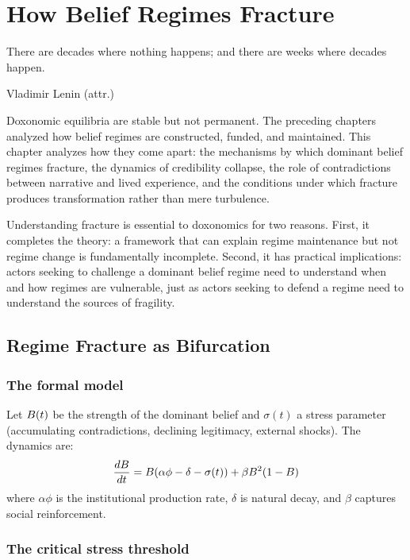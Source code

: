\chapter{How Belief Regimes Fracture}
\label{ch:how-belief-regimes-fracture}

\epigraph{There are decades where nothing happens; and there are weeks where decades happen.}{Vladimir Lenin (attr.)}

\noindent
Doxonomic equilibria are stable but not permanent.
The preceding chapters analyzed how belief regimes are constructed, funded, and maintained.
This chapter analyzes how they come apart: the mechanisms by which dominant belief regimes fracture, the dynamics of credibility collapse, the role of contradictions between narrative and lived experience, and the conditions under which fracture produces transformation rather than mere turbulence.

Understanding fracture is essential to doxonomics for two reasons.
First, it completes the theory: a framework that can explain regime maintenance but not regime change is fundamentally incomplete.
Second, it has practical implications: actors seeking to challenge a dominant belief regime need to understand when and how regimes are vulnerable, just as actors seeking to defend a regime need to understand the sources of fragility.

\section{Regime Fracture as Bifurcation}
\label{sec:ch30-bifurcation}

\subsection{The formal model}

\begin{model}
\label{mod:bifurcation}
Let $B_{}(t)$ be the strength of the dominant belief and $\sigma(t)$ a stress parameter (accumulating contradictions, declining legitimacy, external shocks).
The dynamics are:
\[
  \frac{dB_{}}{dt} = B_{}(\alpha\phi - \delta - \sigma(t)) + \beta B_{}^2(1 - B_{})
\]
where $\alpha\phi$ is the institutional production rate, $\delta$ is natural decay, and $\beta$ captures social reinforcement.
\end{model}

\subsection{The critical stress threshold}

